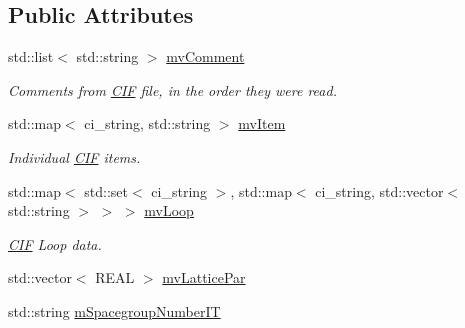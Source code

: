 \subsection*{Public Attributes}
\begin{DoxyCompactItemize}
\item 
\mbox{\label{class_obj_cryst_1_1_c_i_f_data_a9408fb91caf78518c74b0de53a7c4d38}} 
std\+::list$<$ std\+::string $>$ \mbox{\hyperlink{class_obj_cryst_1_1_c_i_f_data_a9408fb91caf78518c74b0de53a7c4d38}{mv\+Comment}}
\begin{DoxyCompactList}\small\item\em Comments from \mbox{\hyperlink{class_obj_cryst_1_1_c_i_f}{C\+IF}} file, in the order they were read. \end{DoxyCompactList}\item 
\mbox{\label{class_obj_cryst_1_1_c_i_f_data_a50f7e91571f28b3a3a66675a564496a6}} 
std\+::map$<$ ci\+\_\+string, std\+::string $>$ \mbox{\hyperlink{class_obj_cryst_1_1_c_i_f_data_a50f7e91571f28b3a3a66675a564496a6}{mv\+Item}}
\begin{DoxyCompactList}\small\item\em Individual \mbox{\hyperlink{class_obj_cryst_1_1_c_i_f}{C\+IF}} items. \end{DoxyCompactList}\item 
\mbox{\label{class_obj_cryst_1_1_c_i_f_data_aebd5e242b7771f184f29647527fcab5a}} 
std\+::map$<$ std\+::set$<$ ci\+\_\+string $>$, std\+::map$<$ ci\+\_\+string, std\+::vector$<$ std\+::string $>$ $>$ $>$ \mbox{\hyperlink{class_obj_cryst_1_1_c_i_f_data_aebd5e242b7771f184f29647527fcab5a}{mv\+Loop}}
\begin{DoxyCompactList}\small\item\em \mbox{\hyperlink{class_obj_cryst_1_1_c_i_f}{C\+IF}} Loop data. \end{DoxyCompactList}\item 
std\+::vector$<$ R\+E\+AL $>$ \mbox{\hyperlink{class_obj_cryst_1_1_c_i_f_data_abefa76784381b2b13a9e1ec4abaa7944}{mv\+Lattice\+Par}}
\item 
\mbox{\label{class_obj_cryst_1_1_c_i_f_data_a3ee9d402a5d06f95e06851d9975aa079}} 
std\+::string \mbox{\hyperlink{class_obj_cryst_1_1_c_i_f_data_a3ee9d402a5d06f95e06851d9975aa079}{m\+Spacegroup\+Number\+IT}}

\end{DoxyCompactItemize}
